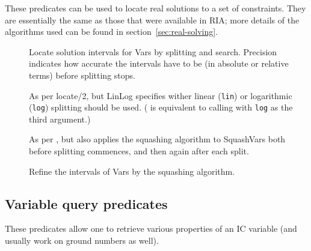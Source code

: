 These predicates can be used to locate real solutions to a set of
constraints.  They are essentially the same as those that were available in
RIA; more details of the algorithms used can be found in
section~\ref{sec:real-solving}.

\begin{description}

\item []
Locate solution intervals for Vars by splitting and search.  Precision
indicates how accurate the intervals have to be (in absolute or relative
terms) before splitting stops.

\item []
As per locate/2, but LinLog specifies wither linear (\texttt{lin}) or
logarithmic (\texttt{log}) splitting should be used.  ( is
equivalent to calling  with \texttt{log} as the third
argument.)

\item []
As per , but also applies the squashing algorithm to
SquashVars both before splitting commences, and then again after each split.

\item []
Refine the intervals of Vars by the squashing algorithm.

\end{description}


\subsection{Variable query predicates}
\label{domain-query}

These predicates allow one to retrieve various properties of an IC variable
(and usually work on ground numbers as well).

